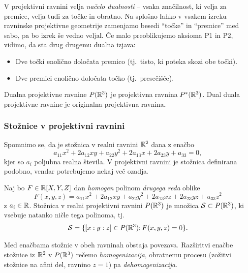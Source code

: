 V projektivni ravnini velja \emph{načelo dualnosti} -- vsaka značilnost, ki velja za premice, velja tudi za točke in obratno. Na splošno lahko v vsakem izreku ravninske projektivne geometrije zamenjamo besedi ``točke'' in ``premice'' med sabo, pa bo izrek še vedno veljal. Če malo preoblikujemo aksioma P1 in P2, vidimo, da sta drug drugemu dualna izjava:
\begin{itemize}
    \item Dve točki enolično določata premico (tj.\ tisto, ki poteka skozi obe točki).
    \item Dve premici enolično določata točko (tj.\ presečišče).
\end{itemize}
Dualna projektivne ravnine $P(\mathbb R^3)$ je projektivna ravnina $P^*(\mathbb R^3)$. Dual duala projektivne ravnine je originalna projektivna ravnina.

\subsubsection*{Stožnice v projektivni ravnini}
\label{podpogl:stoznice_projektivna}

Spomnimo se, da je stožnica v realni ravnini $\mathbb R^2$ dana z enačbo
$$a_{11}x^2 + 2a_{12}xy + a_{22}y^2 + 2a_{13}x + 2a_{23}y + a_{33} = 0,$$
kjer so $a_i$ poljubna realna števila. V projektivni ravnini je stožnica definirana podobno, vendar potrebujemo nekaj več ozadja.
\begin{definicija}
    Naj bo $F \in \mathbb R[X,Y,Z]$ dan \emph{homogen} polinom \emph{drugega reda} oblike
    \begin{equation}
        \label{eq:stoznica_splosna}
        F(x,y,z) = a_{11}x^2 + 2a_{12}xy + a_{22}y^2 + 2a_{13}xz + 2a_{23}yz + a_{33}z^2
    \end{equation}
    z $a_i \in \mathbb R$. Stožnica v realni projektivni ravnini $P(\mathbb R^3)$ je množica $\mathcal{S} \subset P(\mathbb R^3)$, ki vsebuje natanko ničle tega polinoma, tj.
    $$ \mathcal{S} = \{[x:y:z] \in P(\mathbb R^3); F(x,y,z) = 0\}.$$  
\end{definicija}
\begin{opomba}
    Med enačbama stožnic v obeh ravninah obstaja povezava. Razširitvi enačbe stožnice iz $\mathbb R^2$ v $P(\mathbb R^3)$ rečemo \emph{homogenizacija}, obratnemu procesu (zožitvi stožnice na afini del, ravnino $z = 1$) pa \emph{dehomogenizacija}.
\end{opomba}

